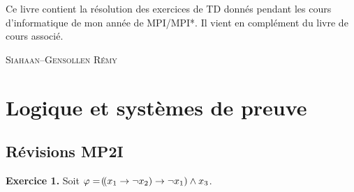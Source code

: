 \documentclass[a4paper,french,bookmarks]{book}
\begin{document}
    \newline\newline\newline
    
    \begin{center}
        \begin{minipage}{0.85\linewidth}
            \large \qquad Ce livre contient la résolution des exercices de TD donnés pendant les cours d'informatique de mon année de MPI/MPI*. Il vient en complément du livre de cours associé.\newline\newline\newline\text{}
        \end{minipage}
    \end{center}
    
    \hfill{\large\textsc{Siahaan--Gensollen Rémy}}
    
    \pagestyle{intro}
    
    
    \newpage
    \dominitoc\nomtcrule 
    {\sffamily\tableofcontents}\mtcaddchapter\pagestyle{toc}
    
    \cleardoublepage
    
    
    \pagestyle{plain}
    
    \chapter{Logique et systèmes de preuve}
    
    \section{Révisions MP2I}
    
    \textbf{Exercice 1.} Soit $\varphi = \!\left(\!\left(x_1 \rightarrow \neg x_2\right) \rightarrow \neg x_1\right) \land x_3$.
    
\end{document}
